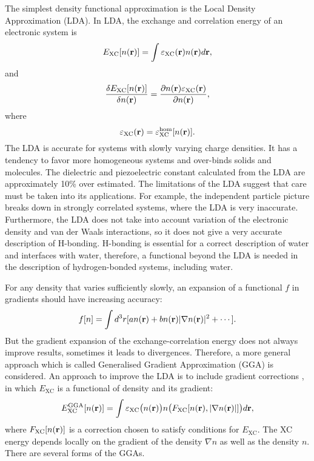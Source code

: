 The simplest density functional approximation is the Local Density Approximation (LDA). 
In LDA, the exchange and correlation energy of an electronic system is
\begin{equation}
E_{\text{XC}}[n({\bf r})]= \int\varepsilon_{\text{XC}}({\bf r}){n({\bf r})}d{\bf r},
\label{eq:E_XC}
\end{equation}
and
\begin{equation}
\frac{\delta E_{\text{XC}}[n({\bf r})]}{\delta n({\bf r})}=\frac{\partial n({\bf r})\varepsilon_{\text{XC}}({\bf r})}{\partial n({\bf r})},
\label{eq:delta_E_XC_2}
\end{equation}
where 
\begin{equation}
\varepsilon_{\text{XC}}({\bf r})= \varepsilon^{\text{hom}}_{\text{XC}}[n({\bf r})].
\end{equation}
The LDA is accurate for systems with slowly varying charge densities. 
It has a tendency to favor more homogeneous systems and over-binds solids and molecules. 
The dielectric and piezoelectric constant calculated from the LDA are approximately 10\% over estimated. 
The limitations of the LDA suggest that care must be taken into its applications. 
For example, the independent particle picture  breaks down in strongly correlated systems, where the LDA is very inaccurate. 
Furthermore, the LDA does not take into account variation of the electronic density and van der Waals interactions\cite{Burke07}, 
so it does not give a very accurate description of H-bonding.
H-bonding is essential for a correct description of water and interfaces 
with water, therefore, a functional beyond the LDA is needed in the description of hydrogen-bonded systems, including water.

For any density that varies sufficiently slowly, an expansion of a functional $f$ in gradients should have increasing
accuracy:
\begin{equation}
f[n]= \int d^3r [a n({\bf r})+b n({\bf r})|\nabla n({\bf r})|^2 + \cdots].
\label{eq:any_f}
\end{equation}
But the gradient expansion of the exchange-correlation energy does not always improve results, sometimes it leads to divergences.
Therefore, a more general approach which is called Generalised  Gradient Approximation (GGA) is considered. An approach to improve the 
LDA is to include gradient corrections , in which $E_{\text{XC}}$ is a functional of density and its gradient:
\begin{equation}
  E^{\text{GGA}}_{\text{XC}}[n({\bf r})] = \int \varepsilon_{\text{XC}}\bigl(n({\bf r})\bigr)n\bigl(F_{\text{XC}}[ n({\bf r}), |\nabla n({\bf r})| ]\bigr)d{\bf{r}},
\end{equation}
where $F_{\text{XC}}[n({\bf r})]$ is a correction chosen to satisfy conditions for $E_{\text{XC}}$. The XC energy depends locally on the
gradient of the density $\nabla n$ as well as the density $n$. There are several forms of the GGAs. 

